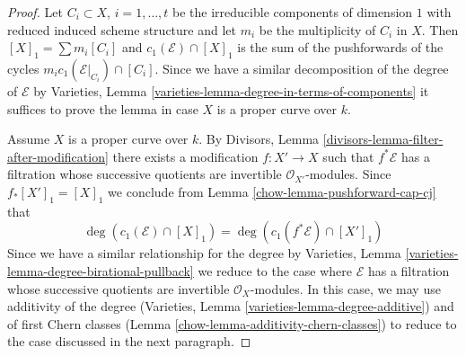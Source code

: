 \begin{proof}

Let $C_i \subset X$, $i = 1, \ldots, t$ be the irreducible components
of dimension $1$ with reduced induced scheme structure and let $m_i$ be the
multiplicity of $C_i$ in $X$. Then $[X]_1 = \sum m_i[C_i]$ and
$c_1(\mathcal{E}) \cap [X]_1$ is the sum of the pushforwards of the cycles
$m_i c_1(\mathcal{E}|_{C_i}) \cap [C_i]$. Since we have a similar decomposition
of the degree of $\mathcal{E}$ by
Varieties, Lemma \ref{varieties-lemma-degree-in-terms-of-components}
it suffices to prove the lemma in case $X$ is a proper curve over $k$.

\medskip\noindent
Assume $X$ is a proper curve over $k$.
By Divisors, Lemma \ref{divisors-lemma-filter-after-modification}
there exists a modification $f : X' \to X$ such that $f^*\mathcal{E}$
has a filtration whose successive quotients are invertible
$\mathcal{O}_{X'}$-modules. Since $f_*[X']_1 = [X]_1$ we conclude
from Lemma \ref{chow-lemma-pushforward-cap-cj} that
$$
\deg(c_1(\mathcal{E}) \cap [X]_1) = \deg(c_1(f^*\mathcal{E}) \cap [X']_1)
$$
Since we have a similar relationship for the degree by
Varieties, Lemma \ref{varieties-lemma-degree-birational-pullback}
we reduce to the case where $\mathcal{E}$ has a filtration whose
successive quotients are invertible $\mathcal{O}_X$-modules.
In this case, we may use additivity of the degree
(Varieties, Lemma \ref{varieties-lemma-degree-additive})
and of first Chern classes (Lemma \ref{chow-lemma-additivity-chern-classes})
to reduce to the case discussed in the next paragraph.


\end{proof}
